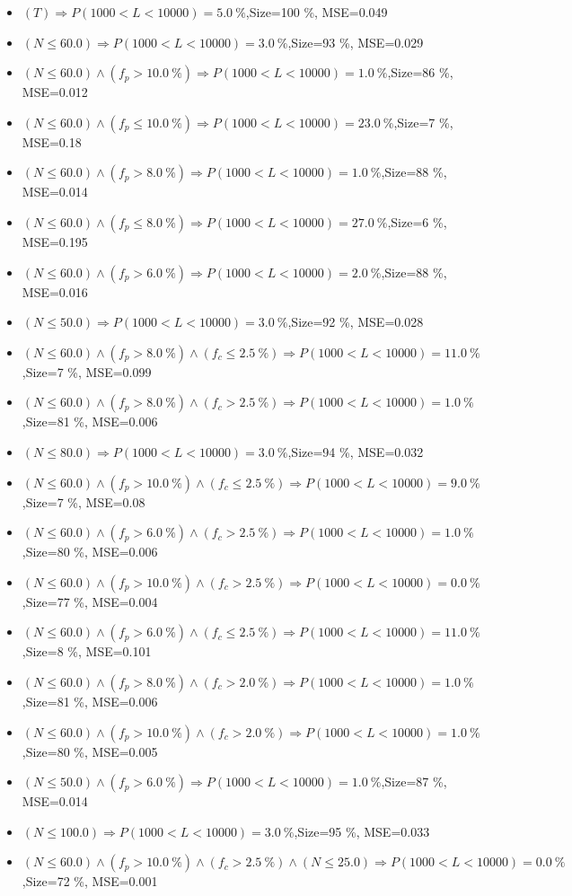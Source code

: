 \documentclass[numbered]{CSL}
\begin{document}
\begin{itemize}
\item $(T) \Rightarrow P(1 000 < L < 10 000) = 5.0~\%$,\hfill Size=100 \%, MSE=0.049
\item $(N \leq 60.0) \Rightarrow P(1 000 < L < 10 000) = 3.0~\%$,\hfill Size=93 \%, MSE=0.029
\item $(N \leq 60.0) \land (f_p > 10.0~\%) \Rightarrow P(1 000 < L < 10 000) = 1.0~\%$,\hfill Size=86 \%, MSE=0.012
\item $(N \leq 60.0) \land (f_p \leq 10.0~\%) \Rightarrow P(1 000 < L < 10 000) = 23.0~\%$,\hfill Size=7 \%, MSE=0.18
\item $(N \leq 60.0) \land (f_p > 8.0~\%) \Rightarrow P(1 000 < L < 10 000) = 1.0~\%$,\hfill Size=88 \%, MSE=0.014
\item $(N \leq 60.0) \land (f_p \leq 8.0~\%) \Rightarrow P(1 000 < L < 10 000) = 27.0~\%$,\hfill Size=6 \%, MSE=0.195
\item $(N \leq 60.0) \land (f_p > 6.0~\%) \Rightarrow P(1 000 < L < 10 000) = 2.0~\%$,\hfill Size=88 \%, MSE=0.016
\item $(N \leq 50.0) \Rightarrow P(1 000 < L < 10 000) = 3.0~\%$,\hfill Size=92 \%, MSE=0.028
\item $(N \leq 60.0) \land (f_p > 8.0~\%) \land (f_c \leq 2.5~\%) \Rightarrow P(1 000 < L < 10 000) = 11.0~\%$,\hfill Size=7 \%, MSE=0.099
\item $(N \leq 60.0) \land (f_p > 8.0~\%) \land (f_c > 2.5~\%) \Rightarrow P(1 000 < L < 10 000) = 1.0~\%$,\hfill Size=81 \%, MSE=0.006
\item $(N \leq 80.0) \Rightarrow P(1 000 < L < 10 000) = 3.0~\%$,\hfill Size=94 \%, MSE=0.032
\item $(N \leq 60.0) \land (f_p > 10.0~\%) \land (f_c \leq 2.5~\%) \Rightarrow P(1 000 < L < 10 000) = 9.0~\%$,\hfill Size=7 \%, MSE=0.08
\item $(N \leq 60.0) \land (f_p > 6.0~\%) \land (f_c > 2.5~\%) \Rightarrow P(1 000 < L < 10 000) = 1.0~\%$,\hfill Size=80 \%, MSE=0.006
\item $(N \leq 60.0) \land (f_p > 10.0~\%) \land (f_c > 2.5~\%) \Rightarrow P(1 000 < L < 10 000) = 0.0~\%$,\hfill Size=77 \%, MSE=0.004
\item $(N \leq 60.0) \land (f_p > 6.0~\%) \land (f_c \leq 2.5~\%) \Rightarrow P(1 000 < L < 10 000) = 11.0~\%$,\hfill Size=8 \%, MSE=0.101
\item $(N \leq 60.0) \land (f_p > 8.0~\%) \land (f_c > 2.0~\%) \Rightarrow P(1 000 < L < 10 000) = 1.0~\%$,\hfill Size=81 \%, MSE=0.006
\item $(N \leq 60.0) \land (f_p > 10.0~\%) \land (f_c > 2.0~\%) \Rightarrow P(1 000 < L < 10 000) = 1.0~\%$,\hfill Size=80 \%, MSE=0.005
\item $(N \leq 50.0) \land (f_p > 6.0~\%) \Rightarrow P(1 000 < L < 10 000) = 1.0~\%$,\hfill Size=87 \%, MSE=0.014
\item $(N \leq 100.0) \Rightarrow P(1 000 < L < 10 000) = 3.0~\%$,\hfill Size=95 \%, MSE=0.033
\item $(N \leq 60.0) \land (f_p > 10.0~\%) \land (f_c > 2.5~\%) \land (N \leq 25.0) \Rightarrow P(1 000 < L < 10 000) = 0.0~\%$,\hfill Size=72 \%, MSE=0.001
\end{itemize}
\end{document}
